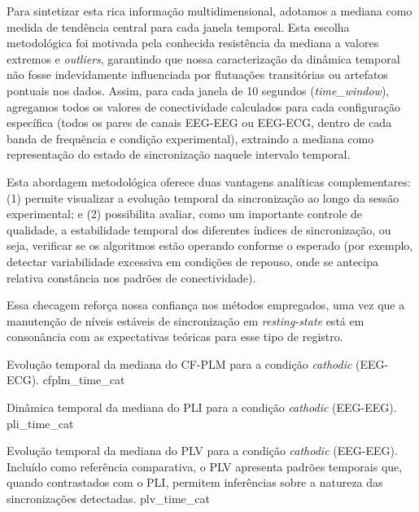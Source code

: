 Para sintetizar esta rica informação multidimensional, adotamos a mediana como medida de tendência central para cada janela temporal. Esta escolha metodológica foi motivada pela conhecida resistência da mediana a valores extremos e \textit{outliers}, garantindo que nossa caracterização da dinâmica temporal não fosse indevidamente influenciada por flutuações transitórias ou artefatos pontuais nos dados. Assim, para cada janela de 10 segundos (\textit{time\_window}), agregamos todos os valores de conectividade calculados para cada configuração específica (todos os pares de canais EEG-EEG ou EEG-ECG, dentro de cada banda de frequência e condição experimental), extraindo a mediana como representação do estado de sincronização naquele intervalo temporal.

Esta abordagem metodológica oferece duas vantagens analíticas complementares: 
(1) permite visualizar a evolução temporal da sincronização ao longo da sessão experimental; e 
(2) possibilita avaliar, como um importante controle de qualidade, a estabilidade temporal dos diferentes índices de sincronização, ou seja, verificar se os algoritmos estão operando conforme o esperado (por exemplo, detectar variabilidade excessiva em condições de repouso, onde se antecipa relativa constância nos padrões de conectividade).

Essa checagem reforça nossa confiança nos métodos empregados, uma vez que a manutenção de níveis estáveis de sincronização em \textit{resting-state} está em consonância com as expectativas teóricas para esse tipo de registro.

{Evolução temporal da mediana do CF-PLM para a condição \textit{cathodic} (EEG-ECG).}
{cfplm_time_cat}

{Dinâmica temporal da mediana do PLI para a condição \textit{cathodic} (EEG-EEG).}
{pli_time_cat}

{Evolução temporal da mediana do PLV para a condição \textit{cathodic} (EEG-EEG). Incluído como referência comparativa, o PLV apresenta padrões temporais que, quando contrastados com o PLI, permitem inferências sobre a natureza das sincronizações detectadas.}
{plv_time_cat}

